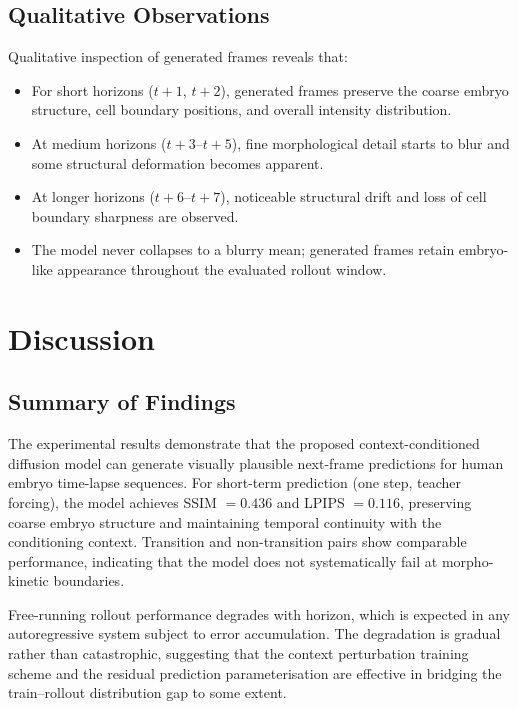\documentclass[12pt, a4paper, twoside]{report}
\begin{document}
\section{Qualitative Observations}
\label{sec:qualitative}

Qualitative inspection of generated frames reveals that:
\begin{itemize}
  \item For short horizons ($t{+}1$, $t{+}2$), generated frames preserve the
        coarse embryo structure, cell boundary positions, and overall intensity
        distribution.
  \item At medium horizons ($t{+}3$--$t{+}5$), fine morphological detail
        starts to blur and some structural deformation becomes apparent.
  \item At longer horizons ($t{+}6$--$t{+}7$), noticeable structural drift
        and loss of cell boundary sharpness are observed.
  \item The model never collapses to a blurry mean; generated frames retain
        embryo-like appearance throughout the evaluated rollout window.
\end{itemize}

\chapter{Discussion}
\label{chap:discussion}

\section{Summary of Findings}
\label{sec:summary}

The experimental results demonstrate that the proposed context-conditioned
diffusion model can generate visually plausible next-frame predictions for
human embryo time-lapse sequences.
For short-term prediction (one step, teacher forcing), the model achieves
SSIM $= 0.436$ and LPIPS $= 0.116$, preserving coarse embryo structure and
maintaining temporal continuity with the conditioning context.
Transition and non-transition pairs show comparable performance, indicating
that the model does not systematically fail at morpho-kinetic boundaries.

Free-running rollout performance degrades with horizon, which is expected in
any autoregressive system subject to error accumulation.
The degradation is gradual rather than catastrophic, suggesting that the
context perturbation training scheme and the residual prediction
parameterisation are effective in bridging the train–rollout distribution
gap to some extent.
\end{document}
